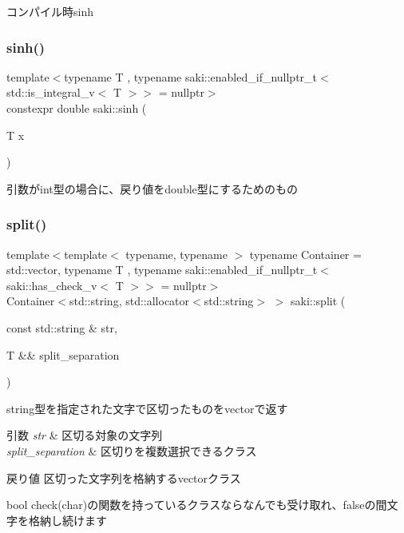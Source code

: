 コンパイル時sinh 

\mbox{\label{namespacesaki_a8199390b7650fdebe491aaeb4c3a44c3}} 
\subsubsection{\texorpdfstring{sinh()}{sinh()}\hspace{0.1cm}{\footnotesize\ttfamily [2/2]}}
{\footnotesize\ttfamily template$<$typename T , typename saki\+::enabled\+\_\+if\+\_\+nullptr\+\_\+t$<$ std\+::is\+\_\+integral\+\_\+v$<$ T $>$$>$  = nullptr$>$ \\
constexpr double saki\+::sinh (\begin{DoxyParamCaption}\item[{T}]{x }\end{DoxyParamCaption})}



引数がint型の場合に、戻り値をdouble型にするためのもの 

\mbox{\label{namespacesaki_ad15185db28f6e77d65411ca83f64f5bb}} 
\subsubsection{\texorpdfstring{split()}{split()}\hspace{0.1cm}{\footnotesize\ttfamily [1/2]}}
{\footnotesize\ttfamily template$<$template$<$ typename, typename $>$ typename Container = std\+::vector, typename T , typename saki\+::enabled\+\_\+if\+\_\+nullptr\+\_\+t$<$ saki\+::has\+\_\+check\+\_\+v$<$ T $>$$>$  = nullptr$>$ \\
Container$<$std\+::string, std\+::allocator$<$std\+::string$>$ $>$ saki\+::split (\begin{DoxyParamCaption}\item[{const std\+::string \&}]{str,  }\item[{T \&\&}]{split\+\_\+separation }\end{DoxyParamCaption})}



string型を指定された文字で区切ったものをvectorで返す 


\begin{DoxyParams}{引数}
{\em str} & 区切る対象の文字列 \\
\hline
{\em split\+\_\+separation} & 区切りを複数選択できるクラス \\
\hline
\end{DoxyParams}
\begin{DoxyReturn}{戻り値}
区切った文字列を格納するvectorクラス
\end{DoxyReturn}
bool check(char)の関数を持っているクラスならなんでも受け取れ、falseの間文字を格納し続けます \mbox{\label{namespacesaki_ac1464436ac78ade2ba14371e2efe1fd2}} 
